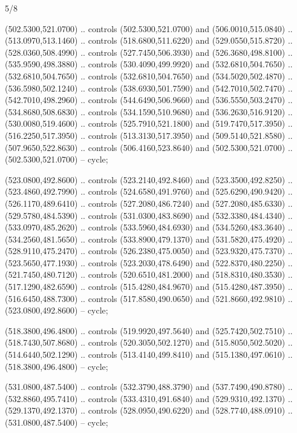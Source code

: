 \begin{flagdescription}{5/8}
\begin{scope}[shift={(m)}]
\begin{scope}[scale=\flagwidth/220,y=0.1mm, x=0.1mm, yscale=-1,shift={(-596,-360)}]
\begin{scope}[cm={{-1.0,0.0,0.0,1.0,(1193.9797,0.0)}}]
\begin{scope}[draw=black,line join=round,line cap=round,line width=0.381\lw]
\begin{scope}[fill=olive]
\end{scope}
\begin{scope}[fill=red]
 (502.5300,521.0700) .. controls (502.5300,521.0700) and
  (506.0010,515.0840) .. (513.0970,513.1460) .. controls (518.6800,511.6220) and
  (529.0550,515.8720) .. (528.0360,508.4990) .. controls (527.7450,506.3930) and
  (526.3680,498.8100) .. (535.9590,498.3880) .. controls (530.4090,499.9920) and
  (532.6810,504.7650) .. (532.6810,504.7650) .. controls (532.6810,504.7650) and
  (534.5020,502.4870) .. (536.5980,502.1240) .. controls (538.6930,501.7590) and
  (542.7010,502.7470) .. (542.7010,498.2960) .. controls (544.6490,506.9660) and
  (536.5550,503.2470) .. (534.8680,508.6830) .. controls (534.1590,510.9680) and
  (536.2630,516.9120) .. (530.0080,519.4600) .. controls (525.7910,521.1800) and
  (519.7470,517.3950) .. (516.2250,517.3950) .. controls (513.3130,517.3950) and
  (509.5140,521.8580) .. (507.9650,522.8630) .. controls (506.4160,523.8640) and
  (502.5300,521.0700) .. (502.5300,521.0700) -- cycle;

 (523.0800,492.8600) .. controls (523.2140,492.8460) and
  (523.3500,492.8250) .. (523.4860,492.7990) .. controls (524.6580,491.9760) and
  (525.6290,490.9420) .. (526.1170,489.6410) .. controls (527.2080,486.7240) and
  (527.2080,485.6330) .. (529.5780,484.5390) .. controls (531.0300,483.8690) and
  (532.3380,484.4340) .. (533.0970,485.2620) .. controls (533.5960,484.6930) and
  (534.5260,483.3640) .. (534.2560,481.5650) .. controls (533.8900,479.1370) and
  (531.5820,475.4920) .. (528.9110,475.2470) .. controls (526.2380,475.0050) and
  (523.9320,475.7370) .. (523.5650,477.1930) .. controls (523.2030,478.6490) and
  (522.8370,480.2250) .. (521.7450,480.7120) .. controls (520.6510,481.2000) and
  (518.8310,480.3530) .. (517.1290,482.6590) .. controls (515.4280,484.9670) and
  (515.4280,487.3950) .. (516.6450,488.7300) .. controls (517.8580,490.0650) and
  (521.8660,492.9810) .. (523.0800,492.8600) -- cycle;

\end{scope}
\begin{scope}[fill=white]
 (518.3800,496.4800) .. controls (519.9920,497.5640) and
  (525.7420,502.7510) .. (518.7430,507.8680) .. controls (520.3050,502.1270) and
  (515.8050,502.5020) .. (514.6440,502.1290) .. controls (513.4140,499.8410) and
  (515.1380,497.0610) .. (518.3800,496.4800) -- cycle;

 (531.0800,487.5400) .. controls (532.3790,488.3790) and
  (537.7490,490.8780) .. (532.8860,495.7410) .. controls (533.4310,491.6840) and
  (529.9310,492.1370) .. (529.1370,492.1370) .. controls (528.0950,490.6220) and
  (528.7740,488.0910) .. (531.0800,487.5400) -- cycle;


\end{scope}
\end{scope}
\end{scope}
\end{scope}
\end{scope}
\end{flagdescription}
